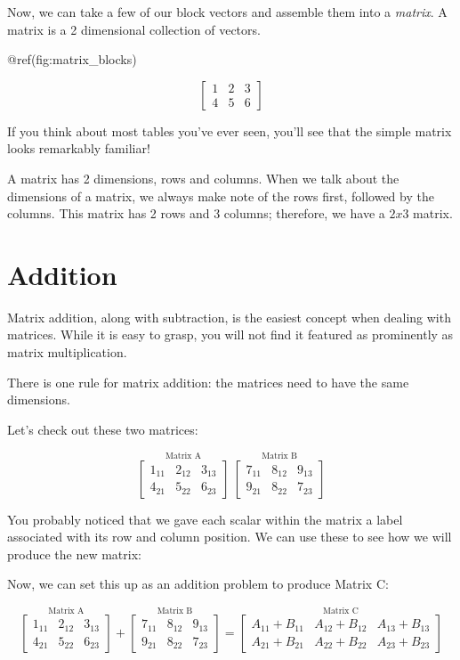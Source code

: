 \documentclass[
  letterpaper,
]{krantz}
\begin{document}
Now, we can take a few of our block vectors and assemble them into a
\emph{matrix}. A matrix is a 2 dimensional collection of vectors.

@ref(fig:matrix\_blocks)

\[
\begin{bmatrix}
1 & 2 & 3\\
4 & 5 & 6
\end{bmatrix}
\]

If you think about most tables you've ever seen, you'll see that the
simple matrix looks remarkably familiar!

A matrix has 2 dimensions, rows and columns. When we talk about the
dimensions of a matrix, we always make note of the rows first, followed
by the columns. This matrix has 2 rows and 3 columns; therefore, we have
a \(2x3\) matrix.

\section{Addition}\label{addition}

Matrix addition, along with subtraction, is the easiest concept when
dealing with matrices. While it is easy to grasp, you will not find it
featured as prominently as matrix multiplication.

There is one rule for matrix addition: the matrices need to have the
same dimensions.

Let's check out these two matrices:

\[
\stackrel{\mbox{Matrix A}}{
\begin{bmatrix}
1_{11} & 2_{12} & 3_{13}\\
4_{21} & 5_{22} & 6_{23}
\end{bmatrix}
}  
\ 
\stackrel{\mbox{Matrix B}}{
\begin{bmatrix}
7_{11} & 8_{12} & 9_{13}\\
9_{21} & 8_{22} & 7_{23}
\end{bmatrix} 
}
\]

You probably noticed that we gave each scalar within the matrix a label
associated with its row and column position. We can use these to see how
we will produce the new matrix:

Now, we can set this up as an addition problem to produce Matrix C:

\[
\stackrel{\mbox{Matrix A}}{
\begin{bmatrix}
1_{11} & 2_{12} & 3_{13}\\
4_{21} & 5_{22} & 6_{23}
\end{bmatrix}
}  
+ 
\stackrel{\mbox{Matrix B}}{
\begin{bmatrix}
7_{11} & 8_{12} & 9_{13}\\
9_{21} & 8_{22} & 7_{23}
\end{bmatrix} 
}
=
\stackrel{\mbox{Matrix C}}{
\begin{bmatrix}
A_{11} + B_{11}& A_{12} + B_{12} & A_{13} + B_{13}\\
A_{21} + B_{21}& A_{22} + B_{22} & A_{23} + B_{23}
\end{bmatrix}
}
\]
\end{document}
